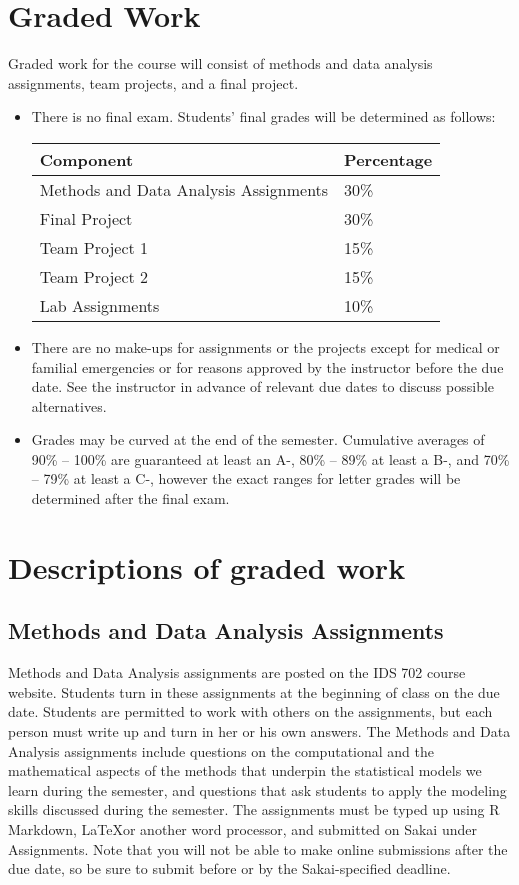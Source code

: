 \documentclass[11pt, a4paper]{article}
\begin{document}
\section{Graded Work} 
Graded work for the course will consist of methods and data analysis assignments, team projects, and a final project. 
\begin{itemize}[label= {\color{darkblue}{\ArrowBoldRightStrobe}}]
	\item There is no final exam. Students' final grades will be determined as follows:
	\begin{table}[h]
		\centering
		\begin{tabular}{ll}
			Component & Percentage \\ \hline
			Methods and Data Analysis Assignments & 30\% \\
			Final Project & 30\% \\ 
			Team Project 1 & 15\% \\
			Team Project 2 & 15\% \\
			Lab Assignments & 10\% \\ \hline 
		\end{tabular}
	\end{table}
	
	\item There are no make-ups for assignments or the projects except for medical or familial emergencies or for reasons approved by the instructor before the due date. See the instructor in advance of relevant due dates to discuss possible alternatives. 
	
	\item Grades may be curved at the end of the semester. Cumulative averages of 90\% -- 100\% are guaranteed at least an A-, 80\% -- 89\% at least a B-, and 70\% -- 79\% at least a C-, however the exact ranges for letter grades will be determined after the final exam. 
\end{itemize}


\section{Descriptions of graded work}
\subsection{Methods and Data Analysis Assignments}
Methods and Data Analysis assignments are posted on the IDS 702 course website. Students turn in these assignments at the beginning of class on the due date. Students are permitted to work with others on the assignments, but each person must write up and turn in her or his own answers. The Methods and Data Analysis assignments include questions on the computational and the mathematical aspects of the methods that underpin the statistical models we learn during the semester, and questions that ask students to apply the modeling skills discussed during the semester. The assignments must be typed up using \textsf{R} Markdown, \LaTeX or another word processor, and submitted on Sakai under Assignments. Note that you will not be able to make online submissions after the due date, so be sure to submit before or by the Sakai-specified deadline.
\end{document}
